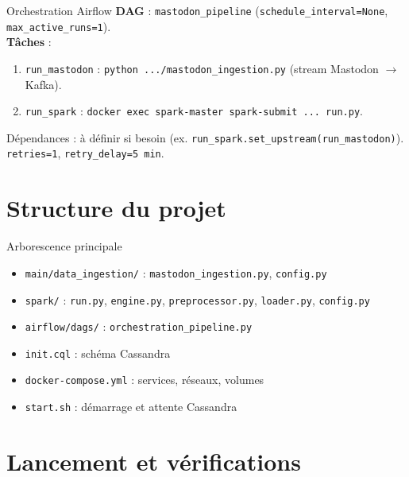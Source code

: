 \documentclass[11pt,aspectratio=169]{beamer}
\begin{document}
\begin{frame}{Orchestration Airflow}
  \textbf{DAG} : \texttt{mastodon\_pipeline} (\texttt{schedule\_interval=None}, \texttt{max\_active\_runs=1}).\\
  \vspace{0.3em}
  \textbf{Tâches} :
  \begin{enumerate}[leftmargin=*]
    \item \texttt{run\_mastodon} : \texttt{python .../mastodon\_ingestion.py} (stream Mastodon $\rightarrow$ Kafka).
    \item \texttt{run\_spark} : \texttt{docker exec spark-master spark-submit ... run.py}.
  \end{enumerate}
  Dépendances : à définir si besoin (ex. \texttt{run\_spark.set\_upstream(run\_mastodon)}). \texttt{retries=1}, \texttt{retry\_delay=5 min}.
\end{frame}

\section{Structure du projet}

\begin{frame}{Arborescence principale}
  \small
  \begin{itemize}[leftmargin=*]
    \item \texttt{main/data\_ingestion/} : \texttt{mastodon\_ingestion.py}, \texttt{config.py}
    \item \texttt{spark/} : \texttt{run.py}, \texttt{engine.py}, \texttt{preprocessor.py}, \texttt{loader.py}, \texttt{config.py}
    \item \texttt{airflow/dags/} : \texttt{orchestration\_pipeline.py}
    \item \texttt{init.cql} : schéma Cassandra
    \item \texttt{docker-compose.yml} : services, réseaux, volumes
    \item \texttt{start.sh} : démarrage et attente Cassandra
  \end{itemize}
\end{frame}

\section{Lancement et vérifications}
\end{document}
